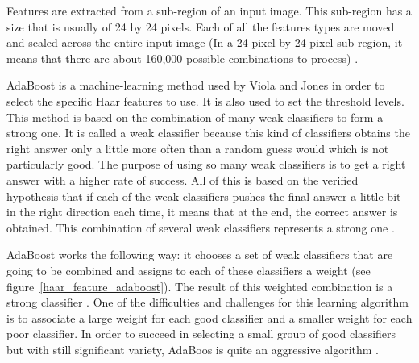 \vspace{\baselineskip}
\noindent Features are extracted from a sub-region of an input image. This sub-region has a size that is usually of 24 by 24 pixels. Each of all the features types are moved and scaled across the entire input image (In a 24 pixel by 24 pixel sub-region, it means that there are about 160,000 possible combinations to process) \cite{SMY07}.
\newline

\noindent AdaBoost is a machine-learning method used by Viola and Jones in order to select the specific Haar features to use. It is also used to set the threshold levels. This method is based on the combination of many weak classifiers to form a strong one. It is called a weak classifier because this kind of classifiers obtains the right answer only a little more often than a random guess would which is not particularly good. The purpose of using so many weak classifiers is to get a right answer with a higher rate of success. All of this is based on the verified hypothesis that if each of the weak classifiers pushes the final answer a little bit in the right direction each time, it means that at the end, the correct answer is obtained. This combination of several weak classifiers represents a strong one \cite{HEW07}. 
\newline

\noindent AdaBoost works the following way: it chooses a set of weak classifiers that are going to be combined and assigns  to each of these classifiers a weight (see figure~\ref{haar_feature_adaboost}). The result of this weighted combination is a strong classifier \cite{HEW07}. One of the difficulties and challenges for this learning algorithm is to associate a large weight for each good classifier and a smaller weight for each poor classifier. In order to succeed in selecting a small group of good classifiers but with still significant variety, AdaBoos is quite an aggressive algorithm \cite{VIO01}.
\newline

